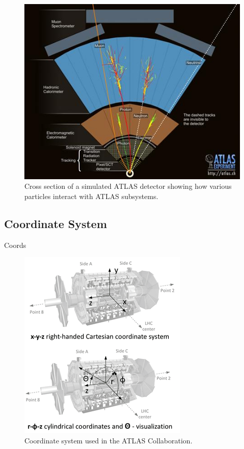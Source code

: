 \begin{figure}[h!]
	\centering
	\includegraphics[width=\columnwidth]{../ThesisImages/LHCImages/ParticleInteractions.jpg}
	\caption[Cross section of a simulated ATLAS detector showing how various particles interact with ATLAS subsystems.]{Cross section of a simulated ATLAS detector showing how various particles interact with ATLAS subsystems.\cite{ParticleInteractions}
	}
	\label{fig:ATLASInteractions}
\end{figure}




\subsection{Coordinate System}
Coords
\begin{figure}[h!]
	\centering
	\includegraphics[width=0.5\columnwidth]{../ThesisImages/LHCImages/ATLASCoords.png}
	\caption[Coordinate system used in the ATLAS Collaboration.]{Coordinate system used in the ATLAS Collaboration.\cite{ATLASCoords}
	}
	\label{fig:ATLASCoords}
\end{figure}



